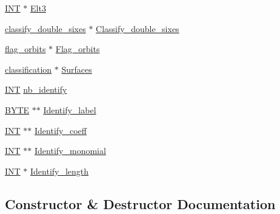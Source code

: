 \begin{DoxyCompactItemize}
\item 
\mbox{\hyperlink{galois_8h_a09fddde158a3a20bd2dcadb609de11dc}{I\+NT}} $\ast$ \mbox{\hyperlink{classsurface__classify__wedge_a690b45fed246b520e45bbd7c1924b2d0}{Elt3}}
\item 
\mbox{\hyperlink{classclassify__double__sixes}{classify\+\_\+double\+\_\+sixes}} $\ast$ \mbox{\hyperlink{classsurface__classify__wedge_acdd8050716a54847c4f1efc19af2ee33}{Classify\+\_\+double\+\_\+sixes}}
\item 
\mbox{\hyperlink{classflag__orbits}{flag\+\_\+orbits}} $\ast$ \mbox{\hyperlink{classsurface__classify__wedge_a0a86d5b25e337cd50f496f1b77c890e3}{Flag\+\_\+orbits}}
\item 
\mbox{\hyperlink{classclassification}{classification}} $\ast$ \mbox{\hyperlink{classsurface__classify__wedge_ab35862ead0d8bdaf51b6c98d143d4c7c}{Surfaces}}
\item 
\mbox{\hyperlink{galois_8h_a09fddde158a3a20bd2dcadb609de11dc}{I\+NT}} \mbox{\hyperlink{classsurface__classify__wedge_a9ae219860cc348d52123795b8e44ae7f}{nb\+\_\+identify}}
\item 
\mbox{\hyperlink{galois_8h_ab6cc7b4aeb6ea31aba2b3fbfc83ff5e6}{B\+Y\+TE}} $\ast$$\ast$ \mbox{\hyperlink{classsurface__classify__wedge_a640862805287593f84eab1671da7b095}{Identify\+\_\+label}}
\item 
\mbox{\hyperlink{galois_8h_a09fddde158a3a20bd2dcadb609de11dc}{I\+NT}} $\ast$$\ast$ \mbox{\hyperlink{classsurface__classify__wedge_ac5042af8da45de161caef68946dc9731}{Identify\+\_\+coeff}}
\item 
\mbox{\hyperlink{galois_8h_a09fddde158a3a20bd2dcadb609de11dc}{I\+NT}} $\ast$$\ast$ \mbox{\hyperlink{classsurface__classify__wedge_a771c9d3e7795a096e23dcc3dacf417bb}{Identify\+\_\+monomial}}
\item 
\mbox{\hyperlink{galois_8h_a09fddde158a3a20bd2dcadb609de11dc}{I\+NT}} $\ast$ \mbox{\hyperlink{classsurface__classify__wedge_ab7181d8458e216bb1e92f1fc8b97fa47}{Identify\+\_\+length}}
\end{DoxyCompactItemize}


\subsection{Constructor \& Destructor Documentation}
\mbox{\label{classsurface__classify__wedge_a0b0a36d62045d315f7f26c7396a1cea4}} 
